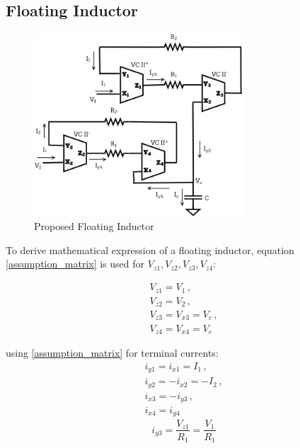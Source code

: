 \documentclass{./styles/svproc}
\begin{document}
\subsection{Floating Inductor}
\begin{figure}[h]
\begin{center}
    \includegraphics[width=0.7\textwidth]{floating inductor.jpg}
    \caption{Proposed Floating Inductor}
  \end{center}
\end{figure}


{To derive mathematical expression of a floating inductor, equation \eqref{assumption_matrix} is used for {$V_{z1},V_{z2},V_{z3},V_{z4}$}:} 

\begin{equation}\label{eq:1.0.1}
\begin{array}{l}
V_{z1}=V_1 \, , \\
V_{z2}=V_2 \,,\\
V_{z3}=V_{x3}=V_c \, ,\\ 
V_{z4}=V_{x4}=V_c
\end{array}
\end{equation}

using \eqref{assumption_matrix} for terminal currents:
\begin{equation}\label{eq:1.0.2}
\begin{array}{l}
i_{y1}=i_{x1}=I_1 \, ,\\
i_{y2}=-i_{x2}=-I_2 \,,\\
i_{x3}=-i_{y3} \, ,\\ 
i_{x4}=i_{y4}
\end{array}
\end{equation}
\begin{equation}\label{eq:1.1}
i_{y3}=\frac{V_{z1}}{R_1}=\frac{V_1}{R_1}
\end{equation}
\end{document}
